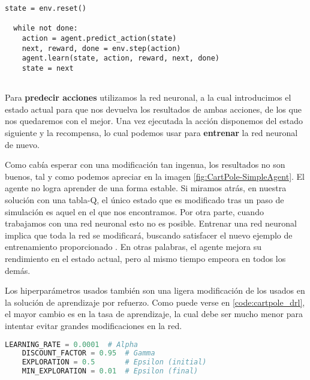 \begin{minipage}{0.9\linewidth}%
\begin{lstlisting}[frame=tb, caption=Pseudocódigo SimpleAgent, inputencoding=latin1, label=code:dqn]      
  state = env.reset()

  while not done:
    action = agent.predict_action(state)
    next, reward, done = env.step(action)
    agent.learn(state, action, reward, next, done)
    state = next
        
\end{lstlisting}%
\end{minipage}

Para \textbf{predecir acciones} utilizamos la red neuronal, a la cual introducimos el estado actual para que nos devuelva los resultados de ambas acciones, de los que nos quedaremos con el mejor. Una vez ejecutada la acción disponemos del estado siguiente y la recompensa, lo cual podemos usar para \textbf{entrenar} la red neuronal de nuevo.

Como cabía esperar con una modificación tan ingenua, los resultados no son buenos, tal y como podemos apreciar en la imagen \ref{fig:CartPole-SimpleAgent}. El agente no logra aprender de una forma estable. Si miramos atrás, en nuestra solución con una tabla-Q, el único estado que es modificado tras un paso de simulación es aquel en el que nos encontramos. Por otra parte, cuando trabajamos con una red neuronal esto no es posible. Entrenar una red neuronal implica que toda la red se modificará, buscando satisfacer el nuevo ejemplo de entrenamiento proporcionado \citep[cap. 2]{Buduma:general}. En otras palabras, el agente mejora su rendimiento en el estado actual, pero al mismo tiempo empeora en todos los demás.

Los hiperparámetros usados también son una ligera modificación de los usados en la solución de aprendizaje por refuerzo. Como puede verse en \ref{code:cartpole_drl}, el mayor cambio es en la tasa de aprendizaje, la cual debe ser mucho menor para intentar evitar grandes modificaciones en la red.

\begin{minipage}{0.9\linewidth}%
    \begin{lstlisting}[frame=tb, language=Python, caption=Hiperparámetros, label=code:cartpole_drl]
    LEARNING_RATE = 0.0001  # Alpha
    DISCOUNT_FACTOR = 0.95  # Gamma
    EXPLORATION = 0.5       # Epsilon (initial)
    MIN_EXPLORATION = 0.01  # Epsilon (final)
    \end{lstlisting}%
\end{minipage}

